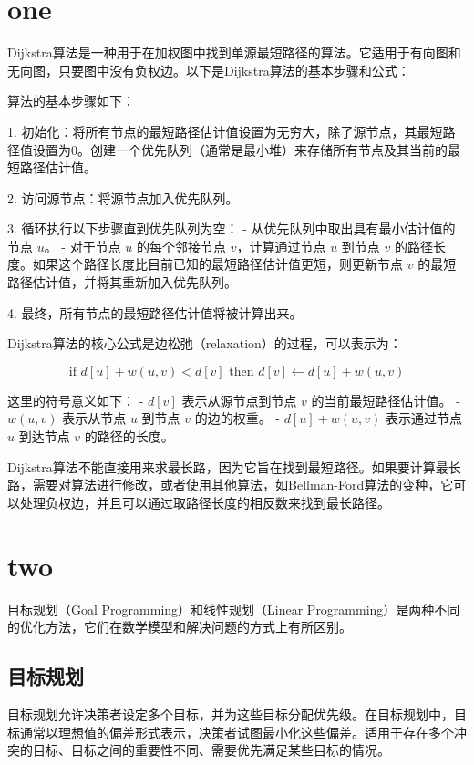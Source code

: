 \documentclass[12pt, a4paper, oneside]{ctexart}
\begin{document}
\section{one}
Dijkstra算法是一种用于在加权图中找到单源最短路径的算法。它适用于有向图和无向图，只要图中没有负权边。以下是Dijkstra算法的基本步骤和公式：

算法的基本步骤如下：

1. 初始化：将所有节点的最短路径估计值设置为无穷大，除了源节点，其最短路径值设置为0。创建一个优先队列（通常是最小堆）来存储所有节点及其当前的最短路径估计值。

2. 访问源节点：将源节点加入优先队列。

3. 循环执行以下步骤直到优先队列为空：
   - 从优先队列中取出具有最小估计值的节点 $u$。
   - 对于节点 $u$ 的每个邻接节点 $v$，计算通过节点 $u$ 到节点 $v$ 的路径长度。如果这个路径长度比目前已知的最短路径估计值更短，则更新节点 $v$ 的最短路径估计值，并将其重新加入优先队列。

4. 最终，所有节点的最短路径估计值将被计算出来。

Dijkstra算法的核心公式是边松弛（relaxation）的过程，可以表示为：


$$\text{if } d[u] + w(u, v) < d[v] \text{ then } d[v] \leftarrow d[u] + w(u, v)$$


这里的符号意义如下：
- $d[v]$ 表示从源节点到节点 $v$ 的当前最短路径估计值。
- $w(u, v)$ 表示从节点 $u$ 到节点 $v$ 的边的权重。
- $d[u] + w(u, v)$ 表示通过节点 $u$ 到达节点 $v$ 的路径的长度。

Dijkstra算法不能直接用来求最长路，因为它旨在找到最短路径。如果要计算最长路，需要对算法进行修改，或者使用其他算法，如Bellman-Ford算法的变种，它可以处理负权边，并且可以通过取路径长度的相反数来找到最长路径。

\section{two}
目标规划（Goal Programming）和线性规划（Linear Programming）是两种不同的优化方法，它们在数学模型和解决问题的方式上有所区别。

\subsection{目标规划}

目标规划允许决策者设定多个目标，并为这些目标分配优先级。在目标规划中，目标通常以理想值的偏差形式表示，决策者试图最小化这些偏差。适用于存在多个冲突的目标、目标之间的重要性不同、需要优先满足某些目标的情况。
\end{document}

